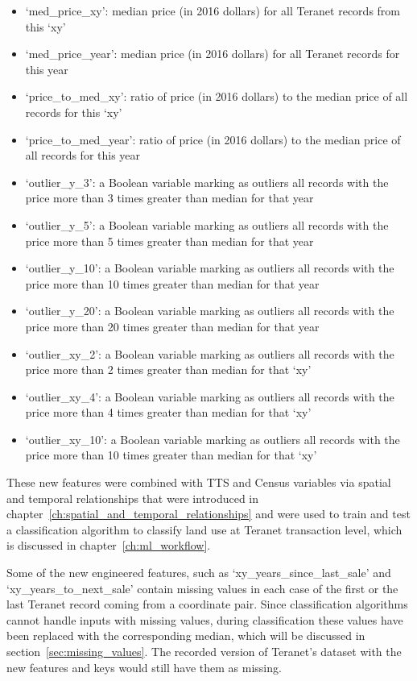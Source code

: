 \begin{itemize}
    \item `med\_price\_xy': median price (in 2016 dollars) for all Teranet records from this `xy'
    \item `med\_price\_year': median price (in 2016 dollars) for all Teranet records for this year
    \item `price\_to\_med\_xy': ratio of price (in 2016 dollars) to the median price of all records for this `xy'
    \item `price\_to\_med\_year': ratio of price (in 2016 dollars) to the median price of all records for this year
    \item `outlier\_y\_3': a Boolean variable marking as outliers all records with the price more than 3 times greater than median for that year
    \item `outlier\_y\_5': a Boolean variable marking as outliers all records with the price more than 5 times greater than median for that year
    \item `outlier\_y\_10': a Boolean variable marking as outliers all records with the price more than 10 times greater than median for that year
    \item `outlier\_y\_20': a Boolean variable marking as outliers all records with the price more than 20 times greater than median for that year
    \item `outlier\_xy\_2': a Boolean variable marking as outliers all records with the price more than 2 times greater than median for that `xy'
    \item `outlier\_xy\_4': a Boolean variable marking as outliers all records with the price more than 4 times greater than median for that `xy'
    \item `outlier\_xy\_10': a Boolean variable marking as outliers all records with the price more than 10 times greater than median for that `xy'
\end{itemize}

These new features were combined with TTS and Census variables via spatial and temporal relationships that were introduced in chapter~\ref{ch:spatial_and_temporal_relationships} and were used to train and test a classification algorithm to classify land use at Teranet transaction level, which is discussed in chapter~\ref{ch:ml_workflow}.

Some of the new engineered features, such as `xy\_years\_since\_last\_sale' and `xy\_years\_to\_next\_sale' contain missing values in each case of the first or the last Teranet record coming from a coordinate pair.
Since classification algorithms cannot handle inputs with missing values, during classification these values have been replaced with the corresponding median, which will be discussed in section~\ref{sec:missing_values}.
The recorded version of Teranet's dataset with the new features and keys would still have them as missing.

